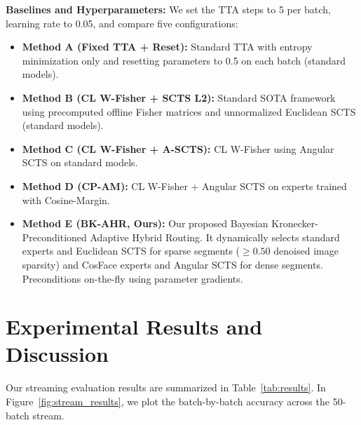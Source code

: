 \documentclass{article}
\theoremstyle{plain}
\theoremstyle{definition}
\theoremstyle{remark}
\begin{document}
\textbf{Baselines and Hyperparameters:} We set the TTA steps to 5 per batch, learning rate to 0.05, and compare five configurations:
\begin{itemize}
  \item \textbf{Method A (Fixed TTA + Reset):} Standard TTA with entropy minimization only and resetting parameters to 0.5 on each batch (standard models).
  \item \textbf{Method B (CL W-Fisher + SCTS L2):} Standard SOTA framework using precomputed offline Fisher matrices and unnormalized Euclidean SCTS (standard models).
  \item \textbf{Method C (CL W-Fisher + A-SCTS):} CL W-Fisher using Angular SCTS on standard models.
  \item \textbf{Method D (CP-AM):} CL W-Fisher + Angular SCTS on experts trained with Cosine-Margin.
  \item \textbf{Method E (BK-AHR, Ours):} Our proposed Bayesian Kronecker-Preconditioned Adaptive Hybrid Routing. It dynamically selects standard experts and Euclidean SCTS for sparse segments ($\ge 0.50$ denoised image sparsity) and CosFace experts and Angular SCTS for dense segments. Preconditions on-the-fly using parameter gradients.
\end{itemize}

\section{Experimental Results and Discussion}
\label{sec:results}

Our streaming evaluation results are summarized in Table~\ref{tab:results}. In Figure~\ref{fig:stream_results}, we plot the batch-by-batch accuracy across the 50-batch stream.
\end{document}
